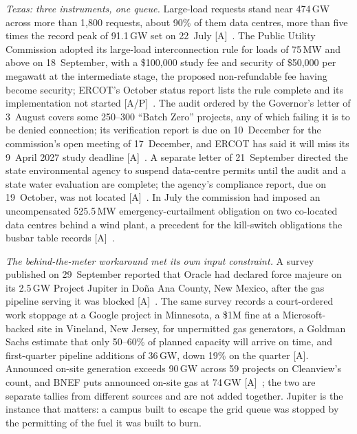 \emph{Texas: three instruments, one queue.} Large-load requests stand near 474\,GW across more than 1,800 requests, about 90\% of them data centres, more than five times the record peak of 91.1\,GW set on 22~July [A]~\cite{cap-ercot-audit}. The Public Utility Commission adopted its large-load interconnection rule for loads of 75\,MW and above on 18~September, with a \$100,000 study fee and security of \$50,000 per megawatt at the intermediate stage, the proposed non-refundable fee having become security; ERCOT's October status report lists the rule complete and its implementation not started [A/P]~\cite{cap-ercot-sb6}. The audit ordered by the Governor's letter of 3~August covers some 250--300 ``Batch Zero'' projects, any of which failing it is to be denied connection; its verification report is due on 10~December for the commission's open meeting of 17~December, and ERCOT has said it will miss its 9~April 2027 study deadline [A]~\cite{cap-ercot-audit}. A separate letter of 21~September directed the state environmental agency to suspend data-centre permits until the audit and a state water evaluation are complete; the agency's compliance report, due on 19~October, was not located [A]~\cite{cap-ercot-sb6}. In July the commission had imposed an uncompensated 525.5\,MW emergency-curtailment obligation on two co-located data centres behind a wind plant, a precedent for the kill-switch obligations the busbar table records [A]~\cite{cap-ercot-audit}.

\emph{The behind-the-meter workaround met its own input constraint.} A survey published on 29~September reported that Oracle had declared force majeure on its 2.5\,GW Project Jupiter in Do\~na Ana County, New Mexico, after the gas pipeline serving it was blocked [A]~\cite{cap-dc-obstacles}. The same survey records a court-ordered work stoppage at a Google project in Minnesota, a \$1M fine at a Microsoft-backed site in Vineland, New Jersey, for unpermitted gas generators, a Goldman Sachs estimate that only 50--60\% of planned capacity will arrive on time, and first-quarter pipeline additions of 36\,GW, down 19\% on the quarter [A]. Announced on-site generation exceeds 90\,GW across 59 projects on Cleanview's count, and BNEF puts announced on-site gas at 74\,GW [A]~\cite{cap-dc-obstacles}; the two are separate tallies from different sources and are not added together. Jupiter is the instance that matters: a campus built to escape the grid queue was stopped by the permitting of the fuel it was built to burn.

